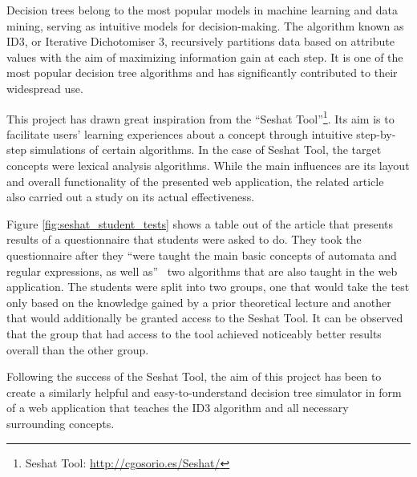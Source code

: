 
Decision trees belong to the most popular models in machine learning and data mining, serving as intuitive models for decision-making. The algorithm known as ID3, or Iterative Dichotomiser 3, recursively partitions data based on attribute values with the aim of maximizing information gain at each step. It is one of the most popular decision tree algorithms and has significantly contributed to their widespread use.

This project has drawn great inspiration from the ``Seshat Tool''\footnote{Seshat Tool: \url{http://cgosorio.es/Seshat/}}. Its aim is to facilitate users' learning experiences about a concept through intuitive step-by-step simulations of certain algorithms. In the case of Seshat Tool, the target concepts were lexical analysis algorithms. While the main influences are its layout and overall functionality of the presented web application, the related article~\cite{https://doi.org/10.1002/cae.22036} also carried out a study on its actual effectiveness.

Figure \ref{fig:seshat_student_tests} shows a table out of the article that presents results of a questionnaire that students were asked to do. They took the questionnaire after they ``were taught the main basic concepts of automata and regular expressions, as well as''~\cite{https://doi.org/10.1002/cae.22036} two algorithms that are also taught in the web application. The students were split into two groups, one that would take the test only based on the knowledge gained by a prior theoretical lecture and another that would additionally be granted access to the Seshat Tool.
It can be observed that the group that had access to the tool achieved noticeably better results overall than the other group.

Following the success of the Seshat Tool, the aim of this project has been to create a similarly helpful and easy-to-understand decision tree simulator in form of a web application that teaches the ID3 algorithm and all necessary surrounding concepts.